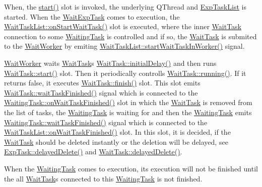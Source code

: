 When, the \hyperlink{class_wait_task_list_a991a520e472601b7c4457035c22c4c22}{start()} slot is invoked, the underlying Q\+Thread and \hyperlink{class_exp_task_list}{Exp\+Task\+List} is started. When the \hyperlink{class_wait_exp_task}{Wait\+Exp\+Task} comes to execution, the \hyperlink{class_wait_task_list_a802528b32bbcacb201bdd5fcfc4dacf6}{Wait\+Task\+List\+::on\+Start\+Wait\+Task()} slot is executed, where the inner \hyperlink{class_wait_task}{Wait\+Task} connection to some \hyperlink{class_waiting_task}{Waiting\+Task} is controlled and if so, the \hyperlink{class_wait_task}{Wait\+Task} is submited to the \hyperlink{class_wait_worker}{Wait\+Worker} by emiting \hyperlink{class_wait_task_list_a1a0af6e55c2eca825e8c31f0ace72305}{Wait\+Task\+List\+::start\+Wait\+Task\+In\+Worker()} signal.

\hyperlink{class_wait_worker}{Wait\+Worker} waits \hyperlink{class_wait_task}{Wait\+Task}\textquotesingle{}s \hyperlink{class_wait_task_a3984ae37eae1a984db2f2417df2bfbbf}{Wait\+Task\+::initial\+Delay()} and then runs \hyperlink{class_wait_task_ab20934c4c6723db758564eef74eec5c4}{Wait\+Task\+::start()} slot. Then it periodically controlls \hyperlink{class_wait_task_a39f09592449c61469d093f980a23cbfd}{Wait\+Task\+::running()}. If it returns false, it executes \hyperlink{class_wait_task_a5f3a89b190e0ef7443cc3b9cc8857e9a}{Wait\+Task\+::finish()} slot. This slot emits \hyperlink{class_wait_task_ae52cf854c36339a1cad9c643e6259978}{Wait\+Task\+::wait\+Task\+Finished()} signal which is connected to the \hyperlink{class_waiting_task_a93e5b1b87723904e6a4babef1bbd4727}{Waiting\+Task\+::on\+Wait\+Task\+Finished()} slot in which the \hyperlink{class_wait_task}{Wait\+Task} is removed from the list of tasks, the \hyperlink{class_waiting_task}{Waiting\+Task} is waiting for and then the \hyperlink{class_waiting_task}{Waiting\+Task} emits \hyperlink{class_waiting_task_a603610acef7edaa2e0e51af6776a18ca}{Waiting\+Task\+::wait\+Task\+Finished()} signal which is connected to the \hyperlink{class_wait_task_list_ab6c3634d0739c8948b028c8db86d804c}{Wait\+Task\+List\+::on\+Wait\+Task\+Finished()} slot. In this slot, it is decided, if the \hyperlink{class_wait_task}{Wait\+Task} should be deleted instantly or the deletion will be delayed, see \hyperlink{class_exp_task_a440f37ee2170c077082f3d29f229be1b}{Exp\+Task\+::delayed\+Delete()} and \hyperlink{class_wait_task_a151808251a297dec52be3d6713eaaf1d}{Wait\+Task\+::delayed\+Delete()}.

When the \hyperlink{class_waiting_task}{Waiting\+Task} comes to execution, its execution will not be finished until the all \hyperlink{class_wait_task}{Wait\+Task}\textquotesingle{}s connected to this \hyperlink{class_waiting_task}{Waiting\+Task} is not finished.

